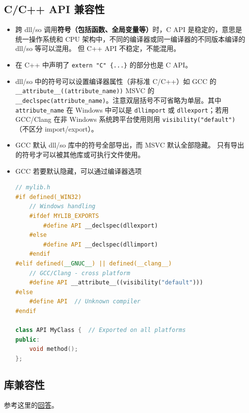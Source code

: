\subsection{C/C++ API 兼容性}
\begin{itemize}
\item 跨 dll/so 调用\textbf{符号（包括函数、全局变量等）}时，C API 是稳定的，意思是统一操作系统和 CPU 架构中，不同的编译器或同一编译器的不同版本编译的 dll/so 等可以混用。 但 C++ API 不稳定，不能混用。
\item 在 C++ 中声明了 \verb`extern "C" {...}` 的部分也是 C API。
\item dll/so 中的符号可以设置编译器属性（非标准 C/C++）如 GCC 的 \verb`__attribute__((attribute_name))` MSVC 的 \verb`__declspec(attribute_name)`。注意双层括号不可省略为单层。其中 \verb`attribute_name` 在 Windows 中可以是 \verb`dllimport` 或 \verb`dllexport`；若用 GCC/Clang 在非 Windows 系统跨平台使用则用 \verb`visibility("default")`（不区分 import/export）。
\item GCC 默认 dll/so 库中的符号全部导出，而 MSVC 默认全部隐藏。 只有导出的符号才可以被其他库或可执行文件使用。
\item GCC 若要默认隐藏，可以通过编译器选项
\begin{lstlisting}[language=cpp]
// mylib.h
#if defined(_WIN32)
    // Windows handling
    #ifdef MYLIB_EXPORTS
        #define API __declspec(dllexport)
    #else
        #define API __declspec(dllimport)
    #endif
#elif defined(__GNUC__) || defined(__clang__)
    // GCC/Clang - cross platform
    #define API __attribute__((visibility("default")))
#else
    #define API  // Unknown compiler
#endif

class API MyClass {  // Exported on all platforms
public:
    void method();
};
\end{lstlisting}
\end{itemize}

\subsection{库兼容性}
参考这里的\href{https://stackoverflow.com/questions/20183883/determining-binary-compatibility-under-linux}{回答}。

